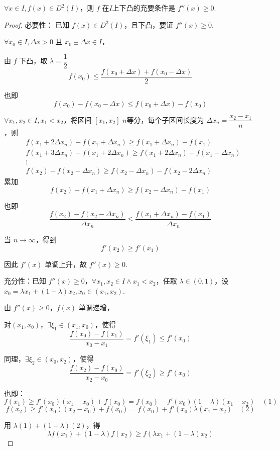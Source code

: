 \begin{proposition}
	$\forall x \in I, f(x) \in D^2(I)$，则 $f$ 在$I$上下凸的充要条件是 $f''(x) \geqslant 0$.
	
	
	
\end{proposition}
\begin{proof}
	必要性： 已知 $f(x) \in D^2(I)$，且下凸，要证 $f''(x) \geqslant 0$.
	
	$\forall x_0 \in I, \Delta x > 0$ 且 $x_0 \pm \Delta x \in I$，
	
	由 \( f \) 下凸，取 \( \lambda = \dfrac{1}{2} \)
	\[
	f(x_0) \leqslant \frac{f(x_0 + \Delta x) + f(x_0 - \Delta x)}{2}
	\]
	
	也即
	\[
	f(x_0) - f(x_0 - \Delta x) \leqslant f(x_0 + \Delta x) - f(x_0)
	\]
	
	\(\forall x_1, x_2 \in I, x_1 < x_2\)，将区间 \([x_1, x_2]\) $n$等分，每个子区间长度为 \(\Delta x_n = \dfrac{x_2 - x_1}{n}\)，则
	\[\begin{aligned}
		&f(x_1 + 2\Delta x_n) - f(x_1 + \Delta x_n)\geqslant f(x_1 + \Delta x_n) - f(x_1)\\
		&f(x_1 + 3\Delta x_n) - f(x_1 + 2\Delta x_n)\geqslant f(x_1 + 2\Delta x_n) - f(x_1 + \Delta x_n)\\
		&\vdots\\
		&f(x_2) - f(x_2 - \Delta x_n)\geqslant f(x_2 - \Delta x_n) - f(x_2 - 2\Delta x_n)
	\end{aligned}\]
	累加
	\[
	f(x_2)-f(x_1+\Delta x_n)\geqslant f(x_2-\Delta x_n)-f(x_1)
	\]
	
	也即
	\[
	\frac{f(x_2) - f(x_2 - \Delta x_n)}{\Delta x_n} \leqslant \frac{f(x_1 + \Delta x_n) - f(x_1)}{\Delta x_n}
	\]
	
	当 \( n \to \infty \)，得到
	\[
	f'(x_2) \geqslant f'(x_1)
	\]
	
	因此 \( f'(x) \) 单调上升，故 \( f''(x) \geqslant 0 \).
	
	充分性：已知 $f''(x) \geqslant 0$，$\forall x_1, x_2 \in I\wedge x_1 < x_2$，任取 $\lambda \in (0,1)$，设 $x_0 = \lambda x_1 + (1-\lambda)x_2, x_0 \in (x_1, x_2)$.
	
	由 $f''(x) \geqslant 0$，$f(x)$ 单调递增，
	
	对$(x_1, x_0)$，$\exists \xi_1 \in (x_1, x_0)$，使得 
	$$
	\frac{f(x_0) - f(x_1)}{x_0 - x_1} = f'(\xi_1) \leqslant f'(x_0)
	$$
	
	同理，$\exists \xi_2 \in (x_0, x_2)$，使得
	$$
	\frac{f(x_2) - f(x_0)}{x_2 - x_0} = f'(\xi_2) \geqslant f'(x_0)
	$$
	
	也即：
	$$
	f(x_1)\geqslant f'(x_0)(x_1-x_0)+f(x_0)=f(x_0)-f'(x_0)(1-\lambda)(x_1-x_2) \quad (1)
	$$
	$$
	f(x_2)\geqslant f'(x_0)(x_2-x_0)+f(x_0)=f(x_0)+f'(x_0)\lambda(x_1-x_2)\quad (2)
	$$
	
	用 $\lambda(1) + (1-\lambda)(2)$，得
	$$
	\lambda f(x_1) + (1-\lambda)f(x_2) \geqslant f(\lambda x_1 + (1-\lambda)x_2)
	$$
	
	
\end{proof}

